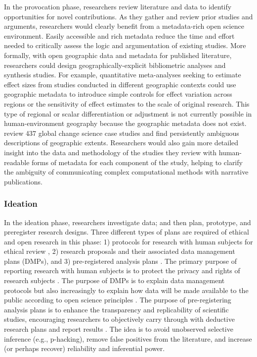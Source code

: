\documentclass{isprs} %
\begin{document}
In the provocation phase, researchers review literature and data to identify opportunities for novel contributions.
As they gather and review prior studies and arguments, researchers would clearly benefit from a metadata-rich open science environment.
Easily accessible and rich metadata reduce the time and effort needed to critically assess the logic and argumentation of existing studies.
More formally, with open geographic data and metadata for published literature, researchers could design geographically-explicit bibliometric analyses and synthesis studies.
For example, quantitative meta-analyses seeking to estimate effect sizes from studies conducted in different geographic contexts could use geographic metadata to introduce simple controls for effect variation across regions or the sensitivity of effect estimates to the scale of original research. 
This type of regional or scalar differentiation or adjustment is not currently possible in human-environment geography because the geographic metadata does not exist.
\citet{Margulies2016} review 437 global change science case studies and find persistently ambiguous descriptions of geographic extents. 
Researchers would also gain more detailed insight into the data and methodology of the studies they review with human-readable forms of metadata for each component of the study, helping to clarify the ambiguity of communicating complex computational methods with narrative publications.

\subsubsection{Ideation}

In the ideation phase, researchers investigate data; and then plan, prototype, and preregister research designs.
Three different types of plans are required of ethical and open research in this phase: 1) protocols for research with human subjects for ethical review \citep{DHEW1978}, 2) research proposals and their associated data management plans (DMPs)\citep{NSF2021}, and 3) pre-registered analysis plans \citep{Nosek2018}. 
The primary purpose of reporting research with human subjects is to protect the privacy and rights of research subjects \citep{DHEW1978}. 
The purpose of DMPs is to explain data management protocols \citep{NSF2021} but also increasingly to explain how data will be made available to the public according to open science principles \citep{Gil2016}. 
The purpose of pre-registering analysis plans is to enhance the transparency and replicability of scientific studies, encouraging researchers to objectively carry through with deductive research plans and report results \citep{Nosek2018}. 
The idea is to avoid unobserved selective inference (e.g., p-hacking), remove false positives from the literature, and increase (or perhaps recover) reliability and inferential power.
\end{document}
